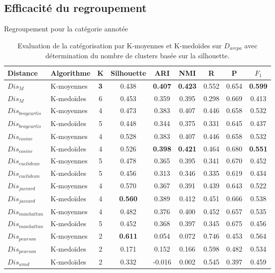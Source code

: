\subsection{Efficacité du regroupement}
\begin{frame}{Regroupement pour la catégorie annotée}
	\begin{table}[!htb]
		\centering \scriptsize
		\begin{tabular}[pos]{|l|l|c|c|c|c|c|c|c|}
			\hline
			{Distance}& {Algorithme}& {K}& {Silhouette}& {ARI} & {NMI} & {R} & {P} & ${F_1}$ \\ \hline
			$Dis_{M}$          & K-moyennes    & \textbf{3} & 0.438      & \textbf{0.407} & \textbf{0.423} & 0.552  & 0.654     & \textbf{0.599} \\ \hline
			$Dis_{M}$          & K-medoïdes  & 6 & 0.453      & 0.359 & 0.395 & 0.298  & 0.669     & 0.413 \\ \hline
			$Dis_{braycurtis}$ & K-moyennes    & 4 & 0.473      & 0.383 & 0.407 & 0.446  & 0.658     & 0.532 \\ \hline
			$Dis_{braycurtis}$ & K-medoïdes  & 5 & 0.448      & 0.344 & 0.375 & 0.331  & 0.645     & 0.437 \\ \hline
			$Dis_{cosine}$     & K-moyennes    & 4 & 0.528      & 0.383 & 0.407 & 0.446  & 0.658     & 0.532 \\ \hline
			$Dis_{cosine}$     & K-medoïdes  & 4 & 0.526      & \textbf{0.398} & \textbf{0.421} & 0.464  & 0.680     & \textbf{0.551} \\ \hline
			$Dis_{euclidean}$  & K-moyennes    & 5 & 0.478      & 0.365 & 0.395 & 0.341  & 0.670     & 0.452 \\ \hline
			$Dis_{euclidean}$  & K-medoïdes  & 5 & 0.456      & 0.313 & 0.346 & 0.335  & 0.619     & 0.434 \\ \hline
			$Dis_{jaccard}$    & K-moyennes    & 4 & 0.570      & 0.367 & 0.391 & 0.439  & 0.643     & 0.522 \\ \hline
			$Dis_{jaccard}$    & K-medoïdes  & 4 & \textbf{0.560}      & 0.389 & 0.412 & 0.451  & 0.666     & 0.538 \\ \hline
			$Dis_{manhattan}$  & K-moyennes    & 4 & 0.482      & 0.376 & 0.400 & 0.452  & 0.657     & 0.535 \\ \hline
			$Dis_{manhattan}$  & K-medoïdes  & 5 & 0.452      & 0.368 & 0.397 & 0.345  & 0.675     & 0.456 \\ \hline
			$Dis_{pearson}$    & K-moyennes    & 2 & \textbf{0.611}      & 0.054 & 0.072 & 0.746  & 0.453     & 0.564 \\ \hline
			$Dis_{pearson}$    & K-medoïdes  & 2 & 0.171      & 0.152 & 0.166 & 0.598  & 0.482     & 0.534 \\ \hline
			$Dis_{wmd}$      & K-medoïdes  & 2 & 0.332      & -0.016 & 0.002 & 0.545  & 0.397     & 0.459 \\ \hline
		\end{tabular}
		\caption{\scriptsize Evaluation de la catégorisation par K-moyennes et K-medoïdes sur ${D}_{arcpa}$ avec détermination du nombre de clusters basée sur la silhouette.} \label{tab:similarite:validation-supervisee-optKbySilhouette}
	\end{table}
\end{frame}


